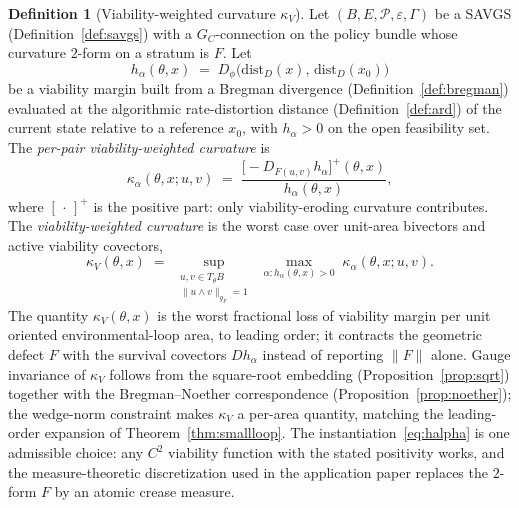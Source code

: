 \documentclass[11pt,a4paper]{article}
\theoremstyle{plain}
\theoremstyle{definition}
\newtheorem{definition}[theorem]{Definition}
\theoremstyle{remark}
\newcommand{\kk}{\kappa_{\!V}}
\newcommand{\distD}{\mathrm{dist}_{D}}
\begin{document}
\begin{definition}[Viability-weighted curvature $\kk$]
\label{def:kv}
Let $(B, E, \mathcal P, \varepsilon, \Gamma)$ be a SAVGS
(Definition~\ref{def:savgs}) with a $G_C$-connection on the policy
bundle whose curvature $2$-form on a stratum is $F$. Let
\begin{equation}\label{eq:halpha}
  h_\alpha(\theta, x) \;=\; D_\phi\bigl(\distD(x),\, \distD(x_0)\bigr)
\end{equation}
be a viability margin built from a Bregman divergence
(Definition~\ref{def:bregman}) evaluated at the algorithmic
rate-distortion distance (Definition~\ref{def:ard}) of the current
state relative to a reference $x_0$, with $h_\alpha > 0$ on the open
feasibility set. The \emph{per-pair viability-weighted curvature} is
\begin{equation}\label{eq:kv-pair}
  \kappa_\alpha(\theta, x; u, v) \;=\;
  \frac{\bigl[-D_{F(u,v)}h_\alpha\bigr]^+(\theta, x)}
       {h_\alpha(\theta, x)},
\end{equation}
where $[\,\cdot\,]^+$ is the positive part: only viability-eroding
curvature contributes. The \emph{viability-weighted curvature} is the
worst case over unit-area bivectors and active viability covectors,
\begin{equation}\label{eq:kv}
  \kk(\theta, x) \;=\; \sup_{\substack{u, v \in T_\theta B \\
  \|u \wedge v\|_{g_F} = 1}}\;
  \max_{\alpha : h_\alpha(\theta, x) > 0}\;
  \kappa_\alpha(\theta, x; u, v).
\end{equation}
The quantity $\kk(\theta, x)$ is the worst fractional loss of
viability margin per unit oriented environmental-loop area, to
leading order; it contracts the geometric defect $F$ with the
survival covectors $D h_\alpha$ instead of reporting $\|F\|$ alone.
Gauge invariance of $\kk$ follows from the square-root embedding
(Proposition~\ref{prop:sqrt}) together with the Bregman--Noether
correspondence (Proposition~\ref{prop:noether}); the wedge-norm
constraint makes $\kk$ a per-area quantity, matching the
leading-order expansion of Theorem~\ref{thm:smallloop}. The
instantiation~\eqref{eq:halpha} is one admissible choice: any $C^2$
viability function with the stated positivity works, and the
measure-theoretic discretization used in the application paper
\citep{zai2026measure} replaces the $2$-form $F$ by an atomic
crease measure.
\end{definition}

\end{document}
